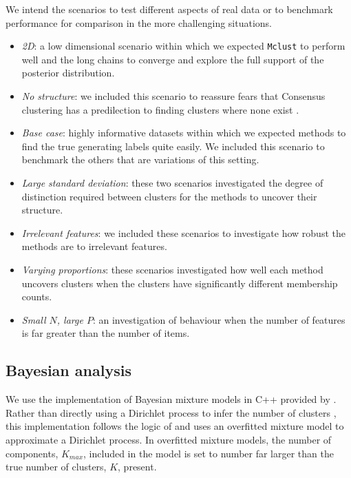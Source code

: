 \documentclass[]{article}
\begin{document}
We intend the scenarios to test different aspects of real data or to benchmark performance for comparison in the more challenging situations.
\begin{itemize}
	\item \emph{2D}: a low dimensional scenario within which we expected \texttt{Mclust} to perform well and the long chains to converge and explore the full support of the posterior distribution.
	\item \emph{No structure}: we included this scenario to reassure fears that Consensus clustering has a predilection to finding clusters where none exist \citep{senbabaoglu2014reassessment,senbabaouglu2014critical}.
	\item \emph{Base case}: highly informative datasets within which we expected methods to find the true generating labels quite easily. We included this scenario to benchmark the others that are variations of this setting.
	\item \emph{Large standard deviation}: these two scenarios investigated the degree of distinction required between clusters for the methods to uncover their structure.
	\item \emph{Irrelevant features}: we included these scenarios to investigate how robust the methods are to irrelevant features.
	\item \emph{Varying proportions}: these scenarios investigated how well each method uncovers clusters when the clusters have significantly different membership counts.
	\item \emph{Small $N$, large $P$}: an investigation of behaviour when the number of features is far greater than the number of items.
\end{itemize}

\subsection{Bayesian analysis} \label{sec:simBayesianAnalysis}
We use the implementation of Bayesian mixture models in C++ provided by \cite{mason2016mdi}. Rather than directly using a Dirichlet process \citep{ferguson1973bayesian} to infer the number of clusters \citep[for example by using Reversible Jump MCMC as described by][]{richardson1997bayesian}, this implementation follows the logic of \cite{van2015overfitting} and uses an overfitted mixture model to approximate a Dirichlet process. In overfitted mixture models, the number of components, $K_{max}$, included in the model is set to number far larger than the true number of clusters, $K$, present. 
\end{document}

